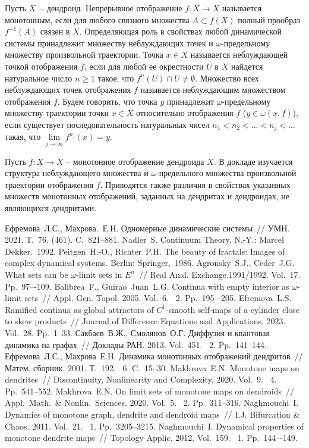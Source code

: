 Пусть $X$~-- дендроид. Непрерывное отображение  $f:X\to X$  называется монотонным, если для любого связного множества $A\subset f(X)$ полный прообраз $f^{-1}(A)$ связен в $X$. Определяющая роль в свойствах любой динамической системы принадлежит множеству неблуждающих точек и $\omega$-предельному множеству произвольной траектории. Точка $x\in X$ называется неблуждающей точкой отображения $f$, если для любой ее окрестности $U$ в $X$ найдется натуральное число $n\ge1$ такое, что $f^n(U)\cap U\ne\emptyset.$ Множество всех неблуждающих точек отображения $f$ называется неблуждающим множеством отображения $f$. Будем говорить, что точка $y$ принадлежит $\omega$-предельному множеству траектории точки $x\in X$ относительно отображения $f$ ($y\in\omega(x,f)$), если существует последовательность натуральных чисел $n_1<n_2<\ldots<n_j<\ldots$ такая, что $\lim\limits_{j\to\infty}f^{n_j}(x)=y$.

Пусть $f:X\to X$ -- монотонное отображение дендроида $X$. В докладе изучается структура неблуждающего множества и $\omega$-предельного множества произвольной траектории отображения $f$. Приводятся также различия в свойствах указанных множеств монотонных отображений, заданных на дендритах и дендроидах, не являющихся дендритами.


\begin{thebibliography}{9} %
Ефремова~Л.С., Махрова.~Е.Н.  Одномерные динамические системы~// УМН. 2021. Т.~76. (461). C.~821--881.
Nadler~S. Continuum Theory.  N.-Y.: Marcel Dekker.~1992.
 Peitgen~H.-O., Richter~P.H.  The beauty of fractals: Images of complex dynamical systems. Berlin: Springer,~1986.
 Agronsky~S.J., Ceder~J.G.  What sets can be $\omega$-limit sets in $E^n$~// Real Anal. Exchange.1991/1992. Vol.~17. Pp.~97–-109.
 Balibrea~F., Guirao~Juan~L.G.  Continua with empty interior as $\omega$-limit sets~// Appl. Gen. Topol. 2005. Vol.~6. \textnumero~2. Pp.~195–-205.
Efremova~L.S.  Ramified continua as global attractors of $C^1$-smooth self-maps of a cylinder close to skew products~// Journal of Difference Equations and Applications. 2023. Vol.~28. Pp.~1--33.
Сакбаев~В.Ж., Смолянов~О.Г.  Диффузия и квантовая динамика на графах~//  Доклады РАН. 2013. Vol.~451. \textnumero~2. Pp.~141--144.
Ефремова~Л.С., Махрова~Е.Н.  Динамика монотонных отображений дендритов~// Матем. сборник. 2001. Т.~192. \textnumero~6. C.~15--30.
Makhrova~E.N.  Monotone maps on dendrites~// Discontinuity, Nonlinearity  and Complexity. 2020. Vol.~9. \textnumero~4. Pp.~541--552.
Makhrova~E.N.   On limit sets of monotone maps on dendroids~// Appl.~Math.~\& Nonlin.~Sciences. 2020. Vol.~5. \textnumero~2. Pp.~311--316.
 Naghmouchi~I. Dynamics of monotone graph, dendrite and dendroid maps~// I.J. Bifurcation \& Chaos. 2011. Vol.~21. \textnumero~1.  Pp.~3205--3215.
Naghmouchi~I. Dynamical properties of monotone dendrite maps~// Topology Applic. 2012. Vol.~159. \textnumero~1.  Pp.~144–-149.
\end{thebibliography}





% 
